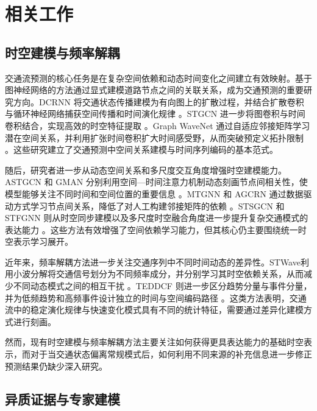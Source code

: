 
\section{相关工作}\label{sec:related-work}

\subsection{时空建模与频率解耦}\label{sec:frequency-related}

交通流预测的核心任务是在复杂空间依赖和动态时间变化之间建立有效映射。基于图神经网络的方法通过显式建模道路节点之间的关联关系，成为交通预测的重要研究方向。DCRNN 将交通状态传播建模为有向图上的扩散过程，并结合扩散卷积与循环神经网络捕获空间传播和时间演化规律 \cite{ref01}。STGCN 进一步将图卷积与时间卷积结合，实现高效的时空特征提取 \cite{ref02}。Graph WaveNet 通过自适应邻接矩阵学习潜在空间关系，并利用扩张时间卷积扩大时间感受野，从而突破预定义拓扑限制 \cite{ref03}。这些研究建立了交通预测中空间关系建模与时间序列编码的基本范式。

随后，研究者进一步从动态空间关系和多尺度交互角度增强时空建模能力。ASTGCN 和 GMAN 分别利用空间---时间注意力机制动态刻画节点间相关性，使模型能够关注不同时间和空间位置的重要信息 \cite{ref04,ref05}。MTGNN 和 AGCRN 通过数据驱动方式学习节点间关系，降低了对人工构建邻接矩阵的依赖 \cite{ref06,ref07}。STSGCN 和 STFGNN 则从时空同步建模以及多尺度时空融合角度进一步提升复杂交通模式的表达能力 \cite{ref08,ref09}。这些方法有效增强了空间依赖学习能力，但其核心仍主要围绕统一时空表示学习展开。

近年来，频率解耦方法进一步关注交通序列中不同时间动态的差异性。STWave利用小波分解将交通信号划分为不同频率成分，并分别学习其时空依赖关系，从而减少不同动态模式之间的相互干扰 \cite{ref10}。TEDDCF \cite{ref18}则进一步区分趋势分量与事件分量，并为低频趋势和高频事件设计独立的时间与空间编码路径 \cite{ref11}。这类方法表明，交通流中的稳定演化规律与快速变化模式具有不同的统计特征，需要通过差异化建模方式进行刻画。

然而，现有时空建模与频率解耦方法主要关注如何获得更具表达能力的基础时空表示，而对于当交通状态偏离常规模式后，如何利用不同来源的补充信息进一步修正预测结果仍缺少深入研究。

\subsection{异质证据与专家建模}\label{sec:experts-related}

